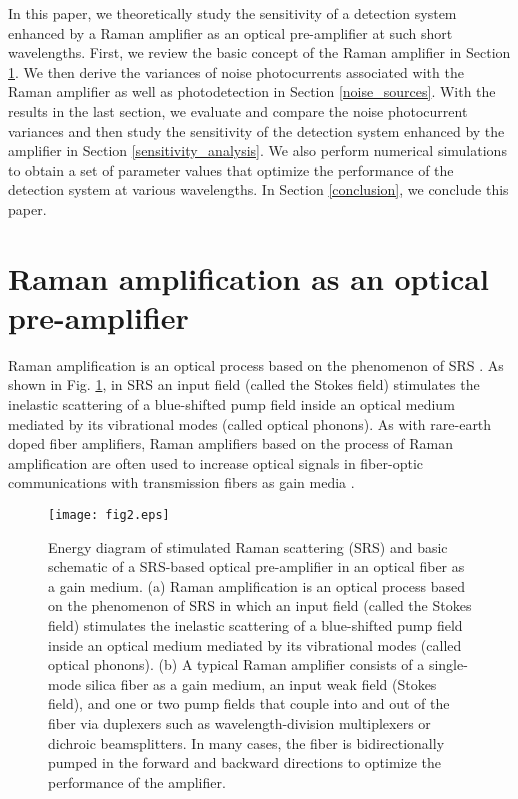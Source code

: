 \documentclass[10pt,letterpaper]{article}
\begin{document}
In this paper, we theoretically study the sensitivity of a detection system enhanced by a Raman amplifier as an optical pre-amplifier at such short wavelengths. First, we review the basic concept of the Raman amplifier in Section \ref{raman_amplifier}. We then derive the variances of noise photocurrents associated with the Raman amplifier as well as photodetection in Section \ref{noise_sources}. With the results in the last section, we evaluate and compare the noise photocurrent variances and then study the sensitivity of the detection system enhanced by the amplifier in Section \ref{sensitivity_analysis}. We also perform numerical simulations to obtain a set of parameter values that optimize the performance of the detection system at various wavelengths. In Section \ref{conclusion}, we conclude this paper.

\section{Raman amplification as an optical pre-amplifier}
\label{raman_amplifier}
Raman amplification is an optical process based on the phenomenon of SRS \cite{agrawal2006academic,islam2002ieee}. As shown in Fig. \ref{fig2}, in SRS an input field (called the Stokes field) stimulates the inelastic scattering of a blue-shifted pump field inside an optical medium mediated by its vibrational modes (called optical phonons). As with rare-earth doped fiber amplifiers, Raman amplifiers based on the process of Raman amplification are often used to increase optical signals in fiber-optic communications with transmission fibers as gain media \cite{agrawal2006academic,islam2002ieee}.  

\begin{figure}[t]
\centering\texttt{[image: fig2.eps]}
\caption{Energy diagram of stimulated Raman scattering (SRS) and basic schematic of a SRS-based optical pre-amplifier in an optical fiber as a gain medium. (a) Raman amplification is an optical process based on the phenomenon of SRS in which an input field (called the Stokes field) stimulates the inelastic scattering of a blue-shifted pump field inside an optical medium mediated by its vibrational modes (called optical phonons). (b) A typical Raman amplifier consists of a single-mode silica fiber as a gain medium, an input weak field (Stokes field), and one or two pump fields that couple into and out of the fiber via duplexers such as wavelength-division multiplexers or dichroic beamsplitters. In many cases, the fiber is bidirectionally pumped in the forward and backward directions to optimize the performance of the amplifier.}
\label{fig2}
\end{figure}
\end{document}
